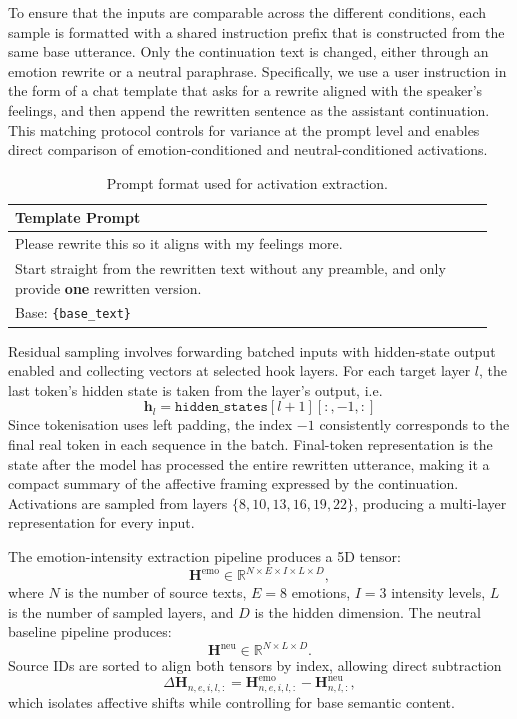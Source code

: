 To ensure that the inputs are comparable across the different conditions, each sample is formatted with a shared instruction prefix that is constructed from the same base utterance. Only the continuation text is changed, either through an emotion rewrite or a neutral paraphrase. Specifically, we use a user instruction in the form of a chat template that asks for a rewrite aligned with the speaker's feelings, and then append the rewritten sentence as the assistant continuation. This matching protocol controls for variance at the prompt level and enables direct comparison of emotion-conditioned and neutral-conditioned activations.

\begin{table}[H]
\centering
\label{tab:activation_prompt}
\begin{tabular}{p{0.95\linewidth}}
\toprule
\textbf{Template Prompt} \\
\midrule
Please rewrite this so it aligns with my feelings more. \\
Start straight from the rewritten text without any preamble, and only provide \textbf{one} rewritten version. \\
Base: \texttt{\{base\_text\}} \\
\bottomrule
\end{tabular}
\caption{Prompt format used for activation extraction.}
\end{table}

Residual sampling involves forwarding batched inputs with hidden-state output enabled and collecting vectors at selected hook layers. For each target layer $l$, the last token's hidden state is taken from the layer's output, i.e.
\[
\mathbf{h}_{l}=\texttt{hidden\_states}[l+1][:,-1,:]
\] 
Since tokenisation uses left padding, the index $-1$ consistently corresponds to the final real token in each sequence in the batch. Final-token representation is the state after the model has processed the entire rewritten utterance, making it a compact summary of the affective framing expressed by the continuation. Activations are sampled from layers $\{8,10,13,16,19,22\}$, producing a multi-layer representation for every input.

The emotion-intensity extraction pipeline produces a 5D tensor:
\[
\mathbf{H}^{\text{emo}} \in \mathbb{R}^{N \times E \times I \times L \times D},
\]
where $N$ is the number of source texts, $E=8$ emotions, $I=3$ intensity levels, $L$ is the number of sampled layers, and $D$ is the hidden dimension. The neutral baseline pipeline produces:
\[
\mathbf{H}^{\text{neu}} \in \mathbb{R}^{N \times L \times D}.
\]
Source IDs are sorted to align both tensors by index, allowing direct subtraction
\[
\Delta\mathbf{H}_{n,e,i,l,:}=\mathbf{H}^{\text{emo}}_{n,e,i,l,:}-\mathbf{H}^{\text{neu}}_{n,l,:},
\]
which isolates affective shifts while controlling for base semantic content.

